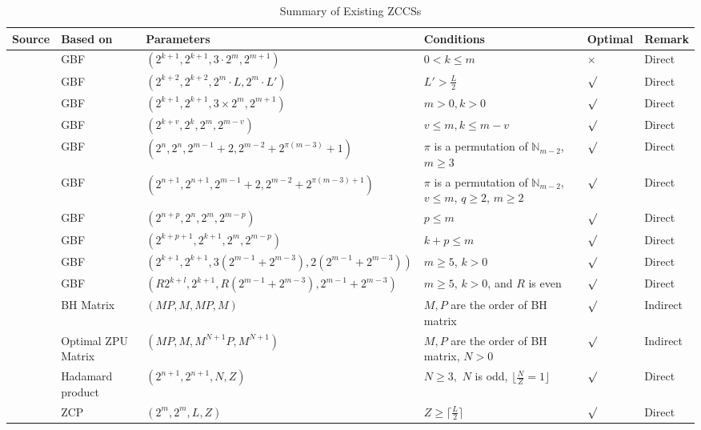 \documentclass[11pt]{article}
\newcommand{\2} {$2$-to-$1$}
\begin{document}
\begin{table}
	\centering
	\setlength{\abovecaptionskip}{0cm}
	\setlength{\belowcaptionskip}{0.2cm}
	\caption{Summary of Existing ZCCSs}
	\tiny
	\begin{tabular}{|m{0.8cm}<{\centering}|m{1.5cm}<{\centering}|m{6cm}<{\centering}|m{3cm}<{\centering}|m{0.8cm}<{\centering}|m{1cm}<{\centering}|}
		\hline Source&Based on&Parameters&Conditions&Optimal&Remark\\
		\hline \cite{XC}&GBF&$(2^{k+1},2^{k+1},3\cdot2^{m},2^{m+1})$&$0<k\leq m$&$\times$& Direct\\
		\hline \cite{XC}&GBF&$(2^{k+2},2^{k+2},2^{m}\cdot L,2^{m}\cdot L')$&$L'>\frac{L}{2}$&$\surd$& Direct\\
		\hline \cite{XC}&GBF&$(2^{k+1},2^{k+1},3\times 2^{m},2^{m+1})$&$m>0,k>0$&$\surd$& Direct\\
		\hline \cite{WS}&GBF&$(2^{k+v},2^{k},2^{m},2^{m-v})$&$v\leq m,k\leq m-v$&$\surd$& Direct\\
		\hline
		\cite{SP3}&GBF&$(2^{n},2^{n},2^{m-1}+2,2^{m-2}+2^{\pi(m-3)}+1)$&$\pi$ is a permutation of $\mathbb{N}_{m-2}$, $m\geq 3$&$\surd$& Direct\\
		\hline \cite{SP3}&GBF&$(2^{n+1},2^{n+1},2^{m-1}+2,2^{m-2}+2^{\pi(m-3)+1})$&$\pi$ is a permutation of $\mathbb{N}_{m-2}$, $v\leq m$, $q\geq 2$, $m\geq 2$&$\surd$& Direct\\
		\hline \cite{SP2}&GBF&$(2^{n+p},2^{n},2^{m},2^{m-p})$&$p\leq m$&$\surd$& Direct\\
		\hline \cite{SP1}&GBF&$(2^{k+p+1},2^{k+1},2^{m},2^{m-p})$&$k+p\leq m$&$\surd$& Direct\\
	
		
		\hline \cite{GG1}&GBF&$(2^{k+1},2^{k+1},3(2^{m-1}+2^{m-3}),2(2^{m-1}+2^{m-3}))$&$m\geq 5$, $k>0$&$\surd$& Direct\\
		\hline \cite{GG1}&GBF&$(R2^{k+l},2^{k+1},R(2^{m-1}+2^{m-3}),2^{m-1}+2^{m-3})$&$m\geq 5$, $k>0$, and $R$ is even&$\surd$& Direct\\
		 \hline \cite{DS}&BH Matrix&$(MP,M,MP,M)$&$M,P$ are the order of  BH matrix &$\surd$& Indirect\\
		\hline \cite{DS}&Optimal ZPU Matrix& $(MP,M,M^{N+1}P,M^{N+1})$&$M,P$ are the order of  BH matrix, $N>0$&$\surd$& Indirect\\
		\hline \cite{AA}&Hadamard product &$(2^{n+1},2^{n+1},N,Z)$&$N\geq 3,$ $N$ is odd, $\lfloor \frac{N}{Z}=1\rfloor$&$\surd$& Direct\\
		\hline \cite{AA}&ZCP&$(2^{m},2^{m},L,Z)$&$Z\geq \lceil \frac{L}{2}\rceil$&$\surd$& Direct\\
	

\end{tabular}
\end{table}
\end{document}
